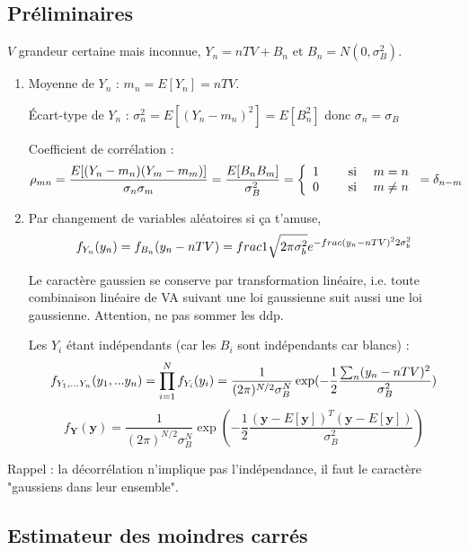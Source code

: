 \documentclass[main.tex]{subfiles}
\begin{document}
\subsection{Préliminaires}
$V$ grandeur certaine mais inconnue, $Y_n=nTV+B_n$ et $B_n=N(0,\sigma_B^2)$.
\begin{enumerate}
\item Moyenne de $Y_n$ : $m_n = E[Y_n] = nTV$.

Écart-type de $Y_n$ : $\sigma_n^2=E[(Y_n-m_n)^2] = E[B_n^2]$ donc $\sigma_n=\sigma_B$

Coefficient de corrélation : \[\rho_{mn} = \frac{E[(Y_n-m_n)(Y_m-m_m)]}{\sigma_n\sigma_m} = \frac{E[B_nB_m]}{\sigma_B^2} = \left\{\begin{array}{cc} 1 & \quad\text{ si }\quad m=n \\ 0 & \quad\text{ si }\quad m\neq n \end{array}\right. = \delta_{n-m}\]

\item Par changement de variables aléatoires si ça t'amuse,
\[f_{Y_n}(y_n) = f_{B_n}(y_n-nTV) = \\frac{1}{\sqrt{2\pi \sigma_b^2}}e^{-frac{(y_n-nTV)^2}{2\sigma_b^2}}\]

Le caractère gaussien se conserve par transformation linéaire, i.e. toute combinaison linéaire de VA suivant une loi gaussienne suit aussi une loi gaussienne. Attention, ne pas sommer les ddp.

Les $Y_i$ étant indépendants (car les $B_i$ sont indépendants car blancs) :
\[f_{Y_1,...Y_n}(y_1,...y_n)=\prod_{i=1}^N f_{Y_i}(y_i)=\frac{1}{(2\pi)^{N/2}\sigma_B^N}\exp(-\frac{1}{2}\frac{\sum_n(y_n-nTV)^2}{\sigma_B^2})\]
\[f_{\mathbf{Y}}(\mathbf{y}) =\frac{1}{(2\pi)^{N/2}\sigma_B^N}\exp(-\frac{1}{2}\frac{(\mathbf{y}-E[\mathbf{y}])^T(\mathbf{y}-E[\mathbf{y}])}{\sigma_B^2})\]
\end{enumerate}

\noindent Rappel : la décorrélation n'implique pas l'indépendance, il faut le caractère "gaussiens dans leur ensemble".

\subsection{Estimateur des moindres carrés}
\end{document}
